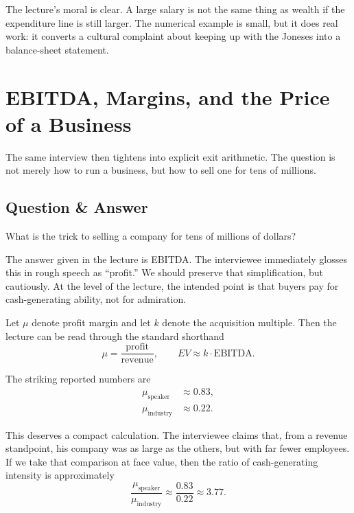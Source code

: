 The lecture's moral is clear. A large salary is not the same thing as wealth if the expenditure line is still larger. The numerical example is small, but it does real work: it converts a cultural complaint about keeping up with the Joneses into a balance-sheet statement.

\section{EBITDA, Margins, and the Price of a Business}

The same interview then tightens into explicit exit arithmetic. The question is not merely how to run a business, but how to sell one for tens of millions.

\subsection{Question \& Answer}

What is the trick to selling a company for tens of millions of dollars?

The answer given in the lecture is EBITDA. The interviewee immediately glosses this in rough speech as ``profit.'' We should preserve that simplification, but cautiously. At the level of the lecture, the intended point is that buyers pay for cash-generating ability, not for admiration.

Let \(\mu\) denote profit margin and let \(k\) denote the acquisition multiple. Then the lecture can be read through the standard shorthand
\begin{equation}
\mu = \frac{\text{profit}}{\text{revenue}},\qquad EV \approx k\cdot \text{EBITDA}.
\end{equation}

The striking reported numbers are
\begin{align}
\mu_{\text{speaker}} &\approx 0.83,\\
\mu_{\text{industry}} &\approx 0.22.
\end{align}

This deserves a compact calculation. The interviewee claims that, from a revenue standpoint, his company was as large as the others, but with far fewer employees. If we take that comparison at face value, then the ratio of cash-generating intensity is approximately
\begin{equation}
\frac{\mu_{\text{speaker}}}{\mu_{\text{industry}}}
\approx
\frac{0.83}{0.22}
\approx 3.77.
\end{equation}

